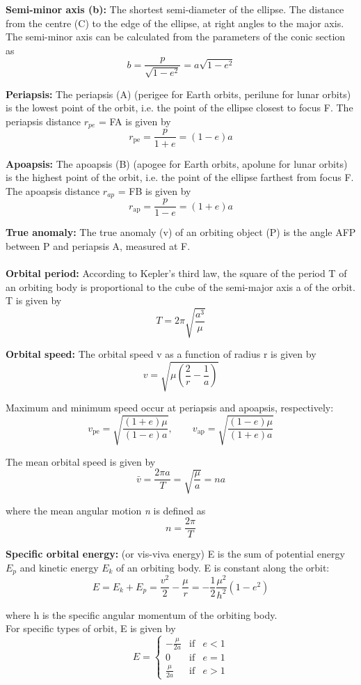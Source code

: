 \documentclass[Orbiter Developer Manual.tex]{subfiles}
\begin{document}
\noindent
\textbf{Semi-minor axis (b):} The shortest semi-diameter of the ellipse. The distance from the centre (C) to the edge of the ellipse, at right angles to the major axis. The semi-minor axis can be calculated from the parameters of the conic section as
\[ b = \frac{p}{\sqrt{1-e^2}} = a \sqrt{1-e^2} \]

\noindent
\textbf{Periapsis:} The periapsis (A) (perigee for Earth orbits, perilune for lunar orbits) is the lowest point of the orbit, i.e. the point of the ellipse closest to focus F. The periapsis distance $r_{pe}$ = FA is given by
\[ r_{\mathrm{pe}} = \frac{p}{1+e} = (1-e)a \]

\noindent
\textbf{Apoapsis:} The apoapsis (B) (apogee for Earth orbits, apolune for lunar orbits) is the highest point of the orbit, i.e. the point of the ellipse farthest from focus F. The apoapsis distance $r_{ap}$ = FB is given by
\[ r_{\mathrm{ap}} = \frac{p}{1-e} = (1+e)a \]

\noindent
\textbf{True anomaly:} The true anomaly (v) of an orbiting object (P) is the angle AFP between P and periapsis A, measured at F.\\
\\
\textbf{Orbital period:} According to Kepler's third law, the square of the period T of an orbiting body is proportional to the cube of the semi-major axis a of the orbit. T is given by
\[ T = 2\pi \sqrt{\frac{a^3}{\mu}} \]

\noindent
\textbf{Orbital speed:} The orbital speed v as a function of radius r is given by
\[ v = \sqrt{\mu\left(\frac{2}{r} - \frac{1}{a}\right)} \]

\noindent
Maximum and minimum speed occur at periapsis and apoapsis, respectively:
\[ v_\mathrm{pe} = \sqrt{\frac{(1+e)\mu}{(1-e)a}}, \qquad v_\mathrm{ap} = \sqrt{\frac{(1-e)\mu}{(1+e)a}} \]

\noindent
The mean orbital speed is given by
\[ \bar{v} = \frac{2\pi a}{T} = \sqrt{\frac{\mu}{a}} = na \]

\noindent
where the mean angular motion \textit{n} is defined as
\[ n = \frac{2 \pi} {T} \]

\noindent
\textbf{Specific orbital energy:} (or vis-viva energy) E is the sum of potential energy $E_{p}$ and kinetic energy $E_{k}$ of an orbiting body. E is constant along the orbit:
\[ E = E_k + E_p = \frac{v^2}{2} - \frac{\mu}{r} = -\frac{1}{2} \frac{\mu^2}{h^2} (1-e^2) \]

\noindent
where h is the specific angular momentum of the orbiting body.\\
For specific types of orbit, E is given by
\[
E = \left\lbrace \begin{array}{cll}
-\frac{\mu}{2a} & \mathrm{if} & e < 1 \\
0 & \mathrm{if} & e = 1 \\
\frac{\mu}{2a} & \mathrm{if} & e > 1
\end{array}\right.
\]
\end{document}
